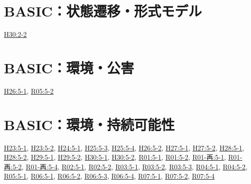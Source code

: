 \section{BASIC：状態遷移・形式モデル}
\hyperref[q:h30-reg-basic-2-2]{H30:2-2}
\section{BASIC：環境・公害}
\hyperref[q:h26-reg-basic-5-1]{H26:5-1}, \hyperref[q:r05-reg-basic-5-2]{R05:5-2}
\section{BASIC：環境・持続可能性}
\hyperref[q:h23-reg-basic-5-1]{H23:5-1}, \hyperref[q:h23-reg-basic-5-2]{H23:5-2}, \hyperref[q:h24-reg-basic-5-1]{H24:5-1}, \hyperref[q:h25-reg-basic-5-3]{H25:5-3}, \hyperref[q:h25-reg-basic-5-4]{H25:5-4}, \hyperref[q:h26-reg-basic-5-2]{H26:5-2}, \hyperref[q:h27-reg-basic-5-1]{H27:5-1}, \hyperref[q:h27-reg-basic-5-2]{H27:5-2}, \hyperref[q:h28-reg-basic-5-1]{H28:5-1}, \hyperref[q:h28-reg-basic-5-2]{H28:5-2}, \hyperref[q:h29-reg-basic-5-1]{H29:5-1}, \hyperref[q:h29-reg-basic-5-2]{H29:5-2}, \hyperref[q:h30-reg-basic-5-1]{H30:5-1}, \hyperref[q:h30-reg-basic-5-2]{H30:5-2}, \hyperref[q:r01-reg-basic-5-1]{R01:5-1}, \hyperref[q:r01-reg-basic-5-2]{R01:5-2}, \hyperref[q:r01-ret-basic-5-1]{R01-再:5-1}, \hyperref[q:r01-ret-basic-5-2]{R01-再:5-2}, \hyperref[q:r01-ret-basic-5-4]{R01-再:5-4}, \hyperref[q:r02-reg-basic-5-1]{R02:5-1}, \hyperref[q:r02-reg-basic-5-2]{R02:5-2}, \hyperref[q:r03-reg-basic-5-1]{R03:5-1}, \hyperref[q:r03-reg-basic-5-2]{R03:5-2}, \hyperref[q:r03-reg-basic-5-3]{R03:5-3}, \hyperref[q:r04-reg-basic-5-1]{R04:5-1}, \hyperref[q:r04-reg-basic-5-2]{R04:5-2}, \hyperref[q:r05-reg-basic-5-1]{R05:5-1}, \hyperref[q:r06-reg-basic-5-1]{R06:5-1}, \hyperref[q:r06-reg-basic-5-2]{R06:5-2}, \hyperref[q:r06-reg-basic-5-3]{R06:5-3}, \hyperref[q:r06-reg-basic-5-4]{R06:5-4}, \hyperref[q:r07-reg-basic-5-1]{R07:5-1}, \hyperref[q:r07-reg-basic-5-2]{R07:5-2}, \hyperref[q:r07-reg-basic-5-4]{R07:5-4}
